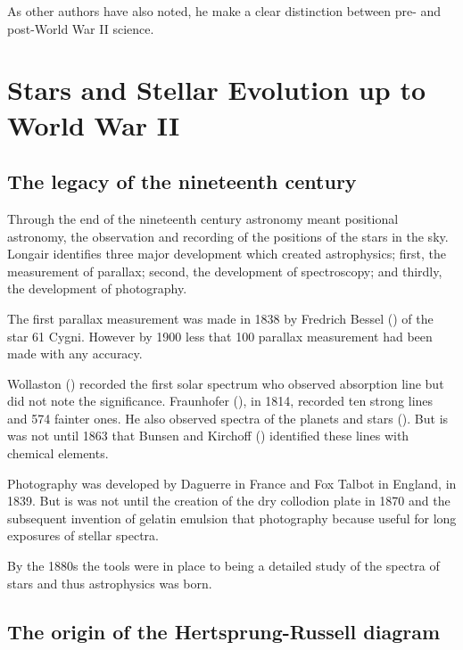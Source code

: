 As other authors have also noted, he make a clear distinction between
pre- and post-World War II science.


\section{Stars and Stellar Evolution up to World War II}

\subsection{The legacy of the nineteenth century}

Through the end of the nineteenth century astronomy
meant positional astronomy, the observation and recording of the
positions of the stars in the sky.  Longair identifies three major
development which created astrophysics; first, the measurement of
parallax; second, the development of spectroscopy; and thirdly, the
development of photography.

The first parallax measurement was made
in 1838 by Fredrich Bessel (\cite{Bessel1839}) of the star 61
Cygni. However by 1900 less that 100 parallax measurement had been
made with any accuracy.

Wollaston (\cite{Wollaston1802})
recorded the first solar spectrum who
observed absorption line but did not note the significance.
Fraunhofer (\cite{Fraunhofer1817}), in 1814, recorded ten strong lines
and 574 fainter ones. He also observed spectra of the planets and
stars (\cite{Fraunhofer1823}). But is was not until 1863 that Bunsen
and Kirchoff (\cite{Kirchoff1861}) identified these lines with
chemical elements.

Photography was developed by Daguerre
in France and Fox Talbot in England, in 1839. But is was not until the
creation of the dry collodion plate in 1870 and the subsequent
invention of gelatin emulsion that photography because useful for long
exposures of stellar spectra.

By the 1880s the tools were in place to being a
detailed study of the spectra of stars and thus astrophysics was born.


\subsection{The origin of the Hertsprung-Russell diagram}

